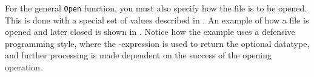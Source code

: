 \documentclass[fsharpNotes.tex]{subfiles}
\begin{document}
For the general \lstinline!Open! function, you must also specify how the file is to be opened. This is done with a special set of values described in . An example of how a file is opened and later closed is shown in .
%
%
Notice how the example uses a defensive programming style, where the -expression is used to return the optional datatype, and further processing is made dependent on the success of the opening operation.

\end{document}
